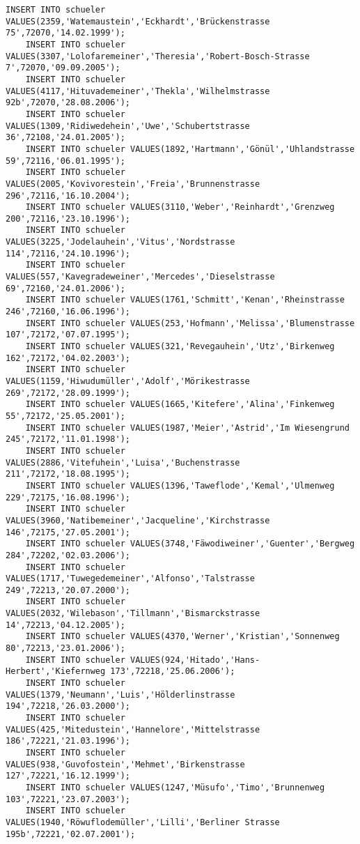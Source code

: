 \begin{lstlisting}[breaklines=True, numbers=none, basicstyle=\tiny, keepspaces=false]
	INSERT INTO schueler VALUES(2359,'Watemaustein','Eckhardt','Brückenstrasse 75',72070,'14.02.1999');
	INSERT INTO schueler VALUES(3307,'Lolofaremeiner','Theresia','Robert-Bosch-Strasse 7',72070,'09.09.2005');
	INSERT INTO schueler VALUES(4117,'Hituvademeiner','Thekla','Wilhelmstrasse 92b',72070,'28.08.2006');
	INSERT INTO schueler VALUES(1309,'Ridiwedehein','Uwe','Schubertstrasse 36',72108,'24.01.2005');
	INSERT INTO schueler VALUES(1892,'Hartmann','Gönül','Uhlandstrasse 59',72116,'06.01.1995');
	INSERT INTO schueler VALUES(2005,'Kovivorestein','Freia','Brunnenstrasse 296',72116,'16.10.2004');
	INSERT INTO schueler VALUES(3110,'Weber','Reinhardt','Grenzweg 200',72116,'23.10.1996');
	INSERT INTO schueler VALUES(3225,'Jodelauhein','Vitus','Nordstrasse 114',72116,'24.10.1996');
	INSERT INTO schueler VALUES(557,'Kavegradeweiner','Mercedes','Dieselstrasse 69',72160,'24.01.2006');
	INSERT INTO schueler VALUES(1761,'Schmitt','Kenan','Rheinstrasse 246',72160,'16.06.1996');
	INSERT INTO schueler VALUES(253,'Hofmann','Melissa','Blumenstrasse 107',72172,'07.07.1995');
	INSERT INTO schueler VALUES(321,'Revegauhein','Utz','Birkenweg 162',72172,'04.02.2003');
	INSERT INTO schueler VALUES(1159,'Hiwudumüller','Adolf','Mörikestrasse 269',72172,'28.09.1999');
	INSERT INTO schueler VALUES(1665,'Kitefere','Alina','Finkenweg 55',72172,'25.05.2001');
	INSERT INTO schueler VALUES(1987,'Meier','Astrid','Im Wiesengrund 245',72172,'11.01.1998');
	INSERT INTO schueler VALUES(2886,'Vitefuhein','Luisa','Buchenstrasse 211',72172,'18.08.1995');
	INSERT INTO schueler VALUES(1396,'Taweflode','Kemal','Ulmenweg 229',72175,'16.08.1996');
	INSERT INTO schueler VALUES(3960,'Natibemeiner','Jacqueline','Kirchstrasse 146',72175,'27.05.2001');
	INSERT INTO schueler VALUES(3748,'Fäwodiweiner','Guenter','Bergweg 284',72202,'02.03.2006');
	INSERT INTO schueler VALUES(1717,'Tuwegedemeiner','Alfonso','Talstrasse 249',72213,'20.07.2000');
	INSERT INTO schueler VALUES(2032,'Wilebason','Tillmann','Bismarckstrasse 14',72213,'04.12.2005');
	INSERT INTO schueler VALUES(4370,'Werner','Kristian','Sonnenweg 80',72213,'23.01.2006');
	INSERT INTO schueler VALUES(924,'Hitado','Hans-Herbert','Kiefernweg 173',72218,'25.06.2006');
	INSERT INTO schueler VALUES(1379,'Neumann','Luis','Hölderlinstrasse 194',72218,'26.03.2000');
	INSERT INTO schueler VALUES(425,'Mitedustein','Hannelore','Mittelstrasse 186',72221,'21.03.1996');
	INSERT INTO schueler VALUES(938,'Guvofostein','Mehmet','Birkenstrasse 127',72221,'16.12.1999');
	INSERT INTO schueler VALUES(1247,'Müsufo','Timo','Brunnenweg 103',72221,'23.07.2003');
	INSERT INTO schueler VALUES(1940,'Röwuflodemüller','Lilli','Berliner Strasse 195b',72221,'02.07.2001');

\end{lstlisting}
